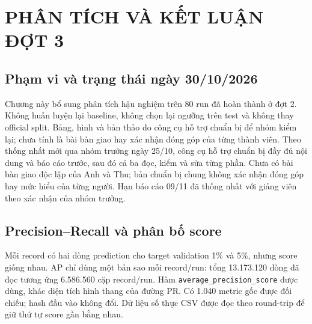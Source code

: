 
\chapter{PHÂN TÍCH VÀ KẾT LUẬN ĐỢT 3}
\label{chap:dot3}
\section{Phạm vi và trạng thái ngày 30/10/2026}
Chương này bổ sung phân tích hậu nghiệm trên 80 run đã hoàn thành ở đợt 2. Không huấn luyện lại baseline, không chọn lại ngưỡng trên test và không thay official split. Bảng, hình và bản thảo do công cụ hỗ trợ chuẩn bị để nhóm kiểm lại; chưa tính là bài bàn giao hay xác nhận đóng góp của từng thành viên. Theo thống nhất mới qua nhóm trưởng ngày 25/10, công cụ hỗ trợ chuẩn bị đầy đủ nội dung và báo cáo trước, sau đó cả ba đọc, kiểm và sửa từng phần. Chưa có bài bàn giao độc lập của Anh và Thu; bản chuẩn bị chung không xác nhận đóng góp hay mức hiểu của từng người. Hạn báo cáo 09/11 đã thống nhất với giảng viên theo xác nhận của nhóm trưởng.



\section{Precision--Recall và phân bố score}
Mỗi record có hai dòng prediction cho target validation 1\% và 5\%, nhưng score giống nhau. AP chỉ dùng một bản sao mỗi record/run: tổng 13.173.120 dòng đã đọc tương ứng 6.586.560 cặp record/run. Hàm \texttt{average\_precision\_score} được dùng, khác diện tích hình thang của đường PR. Có 1.040 metric gốc được đối chiếu; hash đầu vào không đổi. Dữ liệu số thực CSV được đọc theo round-trip để giữ thứ tự score gần bằng nhau.

